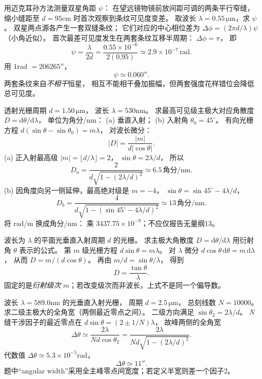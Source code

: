 用迈克耳孙方法测量双星角距 $\psi$：
在望远镜物镜前放间距可调的两条平行窄缝，
缩小缝距至
$d=95$cm 时首次观察到条纹可见度变差。
取波长 $\lambda=0.55\,\mathrm{\mu m}$，求 $\psi$。
\exsolution
双星两点源各产生一套双缝条纹；
它们对应的中心相位差为
$\Delta\phi=(2\pi d/\lambda)\psi$
（小角近似）。
首次最差可见度发生在两套条纹互移半周期：
$\Delta\phi=\pi$，
即
\[
\boxed{\psi=\frac{\lambda}{2d}}
=\frac{0.55\times10^{-6}}{2(0.95)}
\simeq2.9\times10^{-7}\,\mathrm{rad}.
\]
用 $1$rad $=206265''$，
\[
\boxed{\psi\simeq0.060''}.
\]
\excheck 两套条纹来自\emph{不相干}恒星，
相互不能相干叠加振幅，但两套强度花样错位会降低总可见度。

透射光栅周期
$d=1.50\,\mathrm{\mu m}$，
波长 $\lambda=530$nm。
求最高可见级主极大对应角散度
$D=\mathrm d\theta/\mathrm d\lambda$，
单位为角分/nm：
(a) 垂直入射；
(b) 入射角 $\theta_0=45^\circ$。
\exsolution
有向光栅方程
$d(\sin\theta-\sin\theta_0)=m\lambda$，
对波长微分：
\[
\boxed{|D|=\frac{|m|}{d|\cos\theta|}}.
\]
(a) 正入射最高级
$|m|=\lfloor d/\lambda\rfloor=2$，
$\sin\theta=2\lambda/d$，
所以
\[
\boxed{D_a=
\frac2{d\sqrt{1-(2\lambda/d)^2}}
\simeq6.5\,\text{角分/nm}}.
\]
(b) 因角度向另一侧延伸，最高绝对级是
$m=-4$，
$\sin\theta=\sin45^\circ-4\lambda/d$，
\[
\boxed{D_b=
\frac4{d\sqrt{1-(\sin45^\circ-4\lambda/d)^2}}
\simeq13\,\text{角分/nm}}.
\]
\excheck 将 rad/m 换成角分/nm：
乘 $3437.75\times10^{-9}$；不应仅报告无量纲13。

波长为 $\lambda$ 的平面光垂直入射周期 $d$ 的光栅。
求主极大角散度 $D=\mathrm d\theta/\mathrm d\lambda$
用衍射角 $\theta$ 表示的公式。
\exsolution
第 $m$ 级光栅方程
$d\sin\theta=m\lambda$。
对 $\lambda$ 微分
$d\cos\theta\,\mathrm d\theta=m\,\mathrm d\lambda$，
从而
$D=m/(d\cos\theta)$。
再由 $m/d=\sin\theta/\lambda$，
得到
\[
\boxed{D=\frac{\tan\theta}{\lambda}}.
\]
\excheck 固定的是\emph{衍射级次} $m$；若改变级次而非波长，上式不是同一个偏导数。

波长
$\lambda=589.0$nm 的光垂直入射光栅，
周期 $d=2.5\,\mathrm{\mu m}$，
总刻线数 $N=10000$。
求二级主极大的全角宽（两侧最近零点之间）。
\exsolution
二级方向满足
$\sin\theta_2=2\lambda/d$。
$N$ 缝干涉因子的最近零点在
$d\sin\theta=(2\pm1/N)\lambda$，
故峰两侧的全角宽
\[
\boxed{\Delta\theta\simeq
\frac{2\lambda}{Nd\cos\theta_2}
=\frac{2\lambda}
{Nd\sqrt{1-(2\lambda/d)^2}}}.
\]
代数值
$\Delta\theta\simeq5.3\times10^{-5}$rad，
\[
\boxed{\Delta\theta\simeq11''}.
\]
\excheck 题中“angular width”采用全主峰零点间宽度；若定义半宽则差一个因子2。

